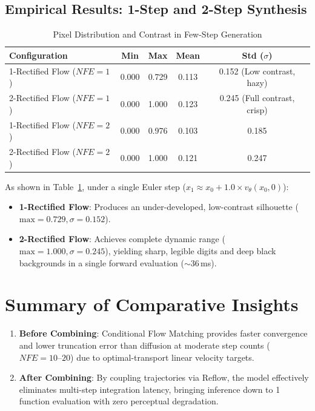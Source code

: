 \documentclass[11pt,a4paper]{article}
\begin{document}
\subsection{Empirical Results: 1-Step and 2-Step Synthesis}

\begin{table}[h]
\centering
\small
\caption{Pixel Distribution and Contrast in Few-Step Generation}
\label{tab:reflow_stats}
\begin{tabular}{@{}lcccc@{}}
\toprule
\textbf{Configuration} & \textbf{Min} & \textbf{Max} & \textbf{Mean} & \textbf{Std ($\sigma$)} \\
\midrule
1-Rectified Flow ($NFE=1$) & 0.000 & 0.729 & 0.113 & 0.152 (Low contrast, hazy) \\
2-Rectified Flow ($NFE=1$) & 0.000 & 1.000 & 0.123 & 0.245 (Full contrast, crisp) \\
1-Rectified Flow ($NFE=2$) & 0.000 & 0.976 & 0.103 & 0.185 \\
2-Rectified Flow ($NFE=2$) & 0.000 & 1.000 & 0.121 & 0.247 \\
\bottomrule
\end{tabular}
\end{table}

As shown in Table~\ref{tab:reflow_stats}, under a single Euler step ($x_1 \approx x_0 + 1.0 \times v_\theta(x_0, 0)$):
\begin{itemize}
    \item \textbf{1-Rectified Flow}: Produces an under-developed, low-contrast silhouette ($\text{max} = 0.729, \sigma = 0.152$).
    \item \textbf{2-Rectified Flow}: Achieves complete dynamic range ($\text{max} = 1.000, \sigma = 0.245$), yielding sharp, legible digits and deep black backgrounds in a single forward evaluation ($\sim 36$\,ms).
\end{itemize}

\section{Summary of Comparative Insights}

\begin{enumerate}
    \item \textbf{Before Combining}: Conditional Flow Matching provides faster convergence and lower truncation error than diffusion at moderate step counts ($NFE=10\text{--}20$) due to optimal-transport linear velocity targets.
    \item \textbf{After Combining}: By coupling trajectories via Reflow, the model effectively eliminates multi-step integration latency, bringing inference down to 1 function evaluation with zero perceptual degradation.
\end{enumerate}
\end{document}
